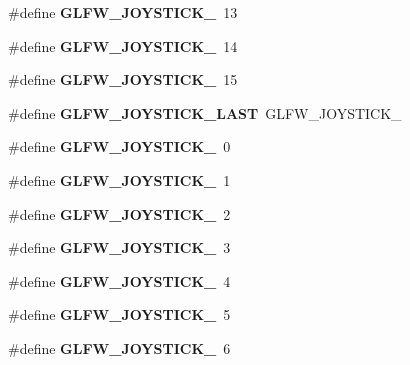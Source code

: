 \begin{DoxyCompactItemize}
\#define {\bfseries G\+L\+F\+W\+\_\+\+J\+O\+Y\+S\+T\+I\+C\+K\+\_}~13
\item 
\mbox{\label{group__joysticks_ga7b02ab70daf7a78bcc942d5d4cc1dcf9}} 
\#define {\bfseries G\+L\+F\+W\+\_\+\+J\+O\+Y\+S\+T\+I\+C\+K\+\_}~14
\item 
\mbox{\label{group__joysticks_ga453edeeabf350827646b6857df4f80ce}} 
\#define {\bfseries G\+L\+F\+W\+\_\+\+J\+O\+Y\+S\+T\+I\+C\+K\+\_}~15
\item 
\mbox{\label{group__joysticks_ga9ca13ebf24c331dd98df17d84a4b72c9}} 
\#define {\bfseries G\+L\+F\+W\+\_\+\+J\+O\+Y\+S\+T\+I\+C\+K\+\_\+\+L\+A\+ST}~G\+L\+F\+W\+\_\+\+J\+O\+Y\+S\+T\+I\+C\+K\+\_
\item 
\mbox{\label{group__joysticks_ga34a0443d059e9f22272cd4669073f73d}} 
\#define {\bfseries G\+L\+F\+W\+\_\+\+J\+O\+Y\+S\+T\+I\+C\+K\+\_}~0
\item 
\mbox{\label{group__joysticks_ga6eab65ec88e65e0850ef8413504cb50c}} 
\#define {\bfseries G\+L\+F\+W\+\_\+\+J\+O\+Y\+S\+T\+I\+C\+K\+\_}~1
\item 
\mbox{\label{group__joysticks_gae6f3eedfeb42424c2f5e3161efb0b654}} 
\#define {\bfseries G\+L\+F\+W\+\_\+\+J\+O\+Y\+S\+T\+I\+C\+K\+\_}~2
\item 
\mbox{\label{group__joysticks_ga97ddbcad02b7f48d74fad4ddb08fff59}} 
\#define {\bfseries G\+L\+F\+W\+\_\+\+J\+O\+Y\+S\+T\+I\+C\+K\+\_}~3
\item 
\mbox{\label{group__joysticks_gae43281bc66d3fa5089fb50c3e7a28695}} 
\#define {\bfseries G\+L\+F\+W\+\_\+\+J\+O\+Y\+S\+T\+I\+C\+K\+\_}~4
\item 
\mbox{\label{group__joysticks_ga74771620aa53bd68a487186dea66fd77}} 
\#define {\bfseries G\+L\+F\+W\+\_\+\+J\+O\+Y\+S\+T\+I\+C\+K\+\_}~5
\item 
\mbox{\label{group__joysticks_ga20a9f4f3aaefed9ea5e66072fc588b87}} 
\#define {\bfseries G\+L\+F\+W\+\_\+\+J\+O\+Y\+S\+T\+I\+C\+K\+\_}~6

\end{DoxyCompactItemize}
